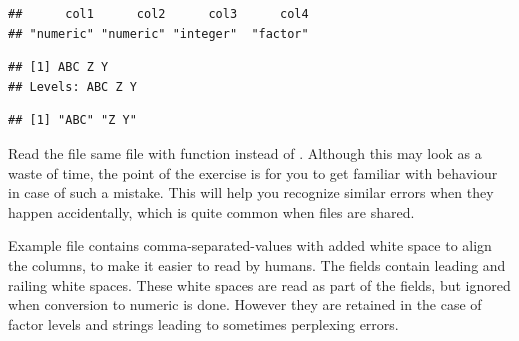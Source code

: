 \documentclass[krantz2]{krantz}\usepackage{knitr}%
\begin{document}
\begin{knitrout}\footnotesize
{}\color{fgcolor}\begin{kframe}
\begin{alltt}
 \hlkwb{<-} \hlstd{(}\hlstd{)}
\end{alltt}
\end{kframe}
\end{knitrout}

\begin{knitrout}\footnotesize
{}\color{fgcolor}\begin{kframe}
\begin{alltt}
\end{alltt}
\begin{verbatim}
##      col1      col2      col3      col4 
## "numeric" "numeric" "integer"  "factor"
\end{verbatim}
\begin{alltt}
\hlstd{from_csv_a.df[[}\hlstd{]]}
\end{alltt}
\begin{verbatim}
## [1] ABC Z Y
## Levels: ABC Z Y
\end{verbatim}
\begin{alltt}
\hlstd{(from_csv_a.df[[}\hlstd{]])}
\end{alltt}
\begin{verbatim}
## [1] "ABC" "Z Y"
\end{verbatim}
\end{kframe}
\end{knitrout}

\begin{playground}
Read the file same file  with function  instead of . Although this may look as a waste of time, the point of the exercise is for you to get familiar with \Rlang behaviour in case of such a mistake. This will help you recognize similar errors when they happen accidentally, which is quite common when files are shared.
\end{playground}

Example file  contains comma-separated-values with added white space to align the columns, to make it easier to read by humans. The fields contain leading and railing white spaces. These white spaces are read as part of the fields, but ignored when conversion to numeric is done. However they are retained in the case of factor levels and strings leading to sometimes perplexing errors.
\end{document}
